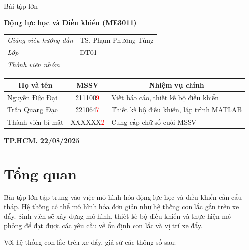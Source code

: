 \documentclass[12pt,a4paper]{article}
\begin{document}
\begin{titlepage}
\begin{center}
    \vspace{2\baselineskip}

    {\LARGE Bài tập lớn}

    \vspace{0.5\baselineskip}
    
    \textbf{\LARGE Động lực học và Điều khiển (ME3011)}

    
    \vfill

    \begin{tabular}{ll}
        \textit{Giảng viên hướng dẫn} &  TS. Phạm Phương Tùng\\
        \textit{Lớp} & DT01\\
        \textit{Thành viên nhóm} & 
    \end{tabular}

    \begin{tabular}{|l|c|l|}
        \hline
        \multicolumn{1}{|c|}{\textbf{\textbf{Họ và tên}}} & \textbf{MSSV} & \multicolumn{1}{c|}{\textbf{Nhiệm vụ chính}}\\ \hline
        Nguyễn Đức Đạt & 211100\textcolor{red}{9} & Viết báo cáo, thiết kế bộ điều khiển \\ \hline
        Trần Quang Đạo & 221064\textcolor{red}{7} & Thiết kế bộ điều khiển, lập trình MATLAB \\ \hline
        Thành viên bí mật & XXXXXX\textcolor{red}{2} & Cung cấp chữ số cuối MSSV\\ \hline
    \end{tabular}

    \vspace{3\baselineskip}

    \textbf{TP.HCM, 22/08/2025}
    \vspace{\baselineskip}
\end{center}
\end{titlepage}

\newpage

\tableofcontents
\newpage

\section{Tổng quan}
Bài tập lớn tập trung vào việc mô hình hóa động lực học và điều khiển cần cẩu tháp. Hệ thống 
có thể mô hình hóa đơn giản như hệ thống con lắc gắn trên xe đẩy. Sinh viên sẽ xây dựng mô 
hình, thiết kế bộ điều khiển và thực hiện mô phỏng để đạt được các yêu cầu về ổn định con lắc 
và vị trí xe đẩy.  

Với hệ thống con lắc trên xe đẩy, giả sử các thông số sau: 
\end{document}
